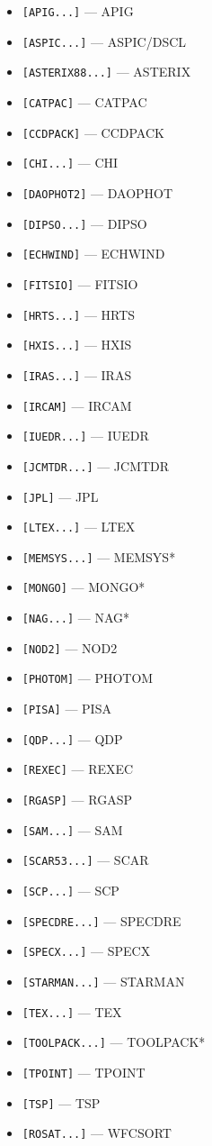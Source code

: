 \begin{itemize}
\item {\tt [APIG...]} --- APIG
\item {\tt [ASPIC...]} --- ASPIC/DSCL
\item {\tt [ASTERIX88...]} --- ASTERIX
\item {\tt [CATPAC]} --- CATPAC
\item {\tt [CCDPACK]} --- CCDPACK
\item {\tt [CHI...]} --- CHI
\item {\tt [DAOPHOT2]} --- DAOPHOT
\item {\tt [DIPSO...]} --- DIPSO
\item {\tt [ECHWIND]} --- ECHWIND
\item {\tt [FITSIO]} --- FITSIO
\item {\tt [HRTS...]} --- HRTS
\item {\tt [HXIS...]} --- HXIS
\item {\tt [IRAS...]} --- IRAS
\item {\tt [IRCAM]} --- IRCAM
\item {\tt [IUEDR...]} --- IUEDR
\item {\tt [JCMTDR...]} --- JCMTDR
\item {\tt [JPL]} --- JPL
\item {\tt [LTEX...]} --- LTEX
\item {\tt [MEMSYS...]} --- MEMSYS*
\item {\tt [MONGO]} --- MONGO*
\item {\tt [NAG...]} --- NAG*
\item {\tt [NOD2]} --- NOD2
\item {\tt [PHOTOM]} --- PHOTOM
\item {\tt [PISA]} --- PISA
\item {\tt [QDP...]} --- QDP
\item {\tt [REXEC]} --- REXEC
\item {\tt [RGASP]} --- RGASP
\item {\tt [SAM...]} --- SAM
\item {\tt [SCAR53...]} --- SCAR
\item {\tt [SCP...]} --- SCP
\item {\tt [SPECDRE...]} --- SPECDRE 
\item {\tt [SPECX...]} --- SPECX
\item {\tt [STARMAN...]} --- STARMAN
\item {\tt [TEX...]} --- TEX
\item {\tt [TOOLPACK...]} --- TOOLPACK*
\item {\tt [TPOINT]} --- TPOINT
\item {\tt [TSP]} --- TSP
\item {\tt [ROSAT...]} --- WFCSORT
\end{itemize}


